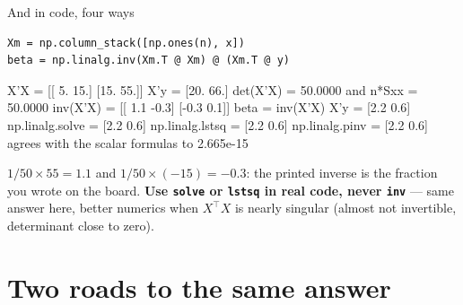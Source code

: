 \documentclass[aspectratio=169]{beamer}
\begin{document}
\begin{frame}[fragile,shrink=6]{And in code, four ways}
\begin{lstlisting}
Xm = np.column_stack([np.ones(n), x])
beta = np.linalg.inv(Xm.T @ Xm) @ (Xm.T @ y)
\end{lstlisting}
\begin{outblk}
X'X =
 [[ 5. 15.]
 [15. 55.]]
X'y = [20. 66.]
det(X'X) = 50.0000   and n*Sxx = 50.0000
inv(X'X) =
 [[ 1.1 -0.3]
 [-0.3  0.1]]
beta = inv(X'X) X'y  = [2.2 0.6]
np.linalg.solve      = [2.2 0.6]
np.linalg.lstsq      = [2.2 0.6]
np.linalg.pinv       = [2.2 0.6]
agrees with the scalar formulas to 2.665e-15
\end{outblk}
\begin{center}\small
  $1/50 \times 55 = 1.1$ and $1/50\times(-15) = -0.3$: the printed inverse is
  the fraction you wrote on the board. \textbf{Use \texttt{solve} or
  \texttt{lstsq} in real code, never \texttt{inv}} --- same answer here,
  better numerics when $X^{\!\top}\!X$ is nearly singular (almost not
  invertible, determinant close to zero).
\end{center}
\end{frame}

\section[Two roads]{Two roads to the same answer}
\label{sec:gd}
\end{document}
